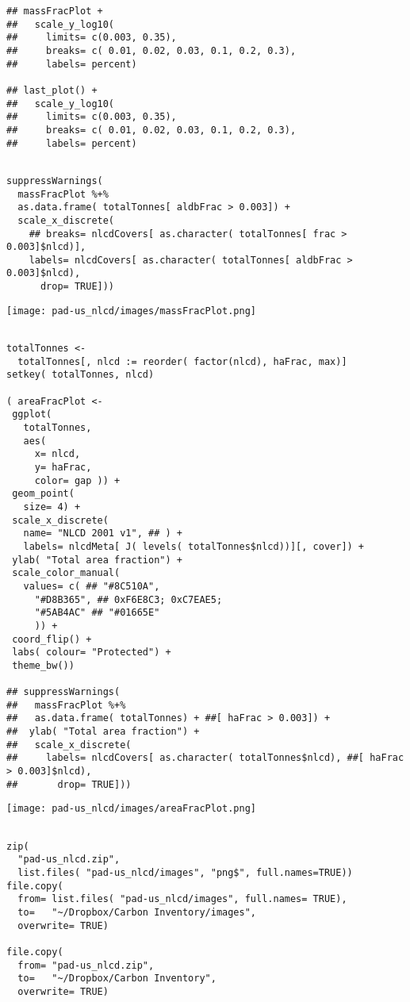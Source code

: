 \documentclass[11pt]{article}
\begin{document}
\begin{verbatim}
## massFracPlot +
##   scale_y_log10(
##     limits= c(0.003, 0.35),
##     breaks= c( 0.01, 0.02, 0.03, 0.1, 0.2, 0.3), 
##     labels= percent)

## last_plot() +
##   scale_y_log10(
##     limits= c(0.003, 0.35),
##     breaks= c( 0.01, 0.02, 0.03, 0.1, 0.2, 0.3), 
##     labels= percent)
\end{verbatim}
   


\begin{verbatim}

suppressWarnings(
  massFracPlot %+%
  as.data.frame( totalTonnes[ aldbFrac > 0.003]) +
  scale_x_discrete(
    ## breaks= nlcdCovers[ as.character( totalTonnes[ frac > 0.003]$nlcd)],
    labels= nlcdCovers[ as.character( totalTonnes[ aldbFrac > 0.003]$nlcd),
      drop= TRUE]))
\end{verbatim}

\texttt{[image: pad-us\_nlcd/images/massFracPlot.png]}


\begin{verbatim}

totalTonnes <-
  totalTonnes[, nlcd := reorder( factor(nlcd), haFrac, max)]
setkey( totalTonnes, nlcd)

( areaFracPlot <-
 ggplot(
   totalTonnes,
   aes(
     x= nlcd,
     y= haFrac,
     color= gap )) +
 geom_point(
   size= 4) +
 scale_x_discrete(
   name= "NLCD 2001 v1", ## ) +
   labels= nlcdMeta[ J( levels( totalTonnes$nlcd))][, cover]) +
 ylab( "Total area fraction") +
 scale_color_manual(
   values= c( ## "#8C510A",
     "#D8B365", ## 0xF6E8C3; 0xC7EAE5;
     "#5AB4AC" ## "#01665E"
     )) + 
 coord_flip() +
 labs( colour= "Protected") +
 theme_bw())

## suppressWarnings(
##   massFracPlot %+%
##   as.data.frame( totalTonnes) + ##[ haFrac > 0.003]) +
##  ylab( "Total area fraction") +
##   scale_x_discrete(
##     labels= nlcdCovers[ as.character( totalTonnes$nlcd), ##[ haFrac > 0.003]$nlcd),
##       drop= TRUE]))
\end{verbatim}

\texttt{[image: pad-us\_nlcd/images/areaFracPlot.png]}


\begin{verbatim}

zip(
  "pad-us_nlcd.zip",
  list.files( "pad-us_nlcd/images", "png$", full.names=TRUE))
file.copy(
  from= list.files( "pad-us_nlcd/images", full.names= TRUE), 
  to=   "~/Dropbox/Carbon Inventory/images",
  overwrite= TRUE)

file.copy(
  from= "pad-us_nlcd.zip",
  to=   "~/Dropbox/Carbon Inventory",
  overwrite= TRUE)
\end{verbatim}
\end{document}
